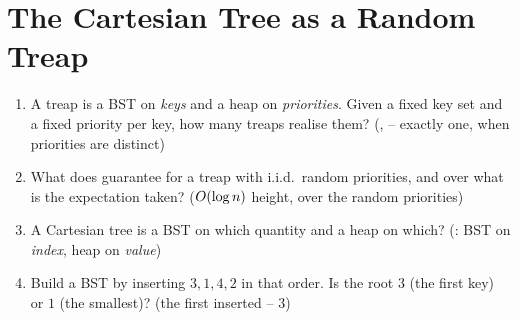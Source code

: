\section{The Cartesian Tree as a Random Treap}\label{sec:c26-treapview}

\begin{previouslybox}
\begin{enumerate}[nosep, leftmargin=1.6em]
  \item A treap is a BST on \emph{keys} and a heap on \emph{priorities}. Given a fixed key set and a
        fixed priority per key, how many treaps realise them? (,  -- exactly
        one, when priorities are distinct)
  \item What does  guarantee for a treap with i.i.d.\ random priorities, and over
        what is the expectation taken? ($O(\log n)$ height, over the random priorities)
  \item A Cartesian tree is a BST on which quantity and a heap on which? (: BST on
        \emph{index}, heap on \emph{value})
  \item Build a BST by inserting $3,1,4,2$ in that order. Is the root $3$ (the first key) or $1$ (the
        smallest)? (the first inserted -- $3$)
\end{enumerate}
\end{previouslybox}

